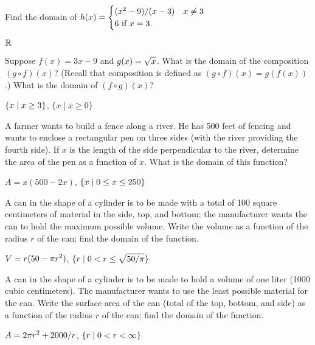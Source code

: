 \begin{exercises}
\exercise Find the domain of $\displaystyle h(x) = \begin{cases}
(x^2-9)/(x-3)& x\neq 3 \\
 6 \mbox{ if $x=3$.} \end{cases}$
\begin{answer} $\mathbb{R}$
\end{answer}

\exercise Suppose $f(x) = 3x-9$ and $\displaystyle g(x) = \sqrt{x}$.  What is the
domain of the composition $(g\circ f)(x)$?  (Recall that 
{\dfont composition%
\/}
is defined as $(g\circ f)(x) = g(f(x))$.)  What is the
domain of $(f\circ g)(x)$?
\begin{answer} $\displaystyle \{x\mid x\ge3\}$, $\{x\mid x\ge0\}$
\end{answer}

\exercise A farmer wants to build a fence along a river.  He has
500 feet of fencing and wants to enclose a rectangular pen on three
sides (with the river providing the fourth side).  If $x$ is the
length of the side perpendicular to the river, determine the area of
the pen as a function of $x$.  What is the domain of this function?
\begin{answer} $A=x(500-2x)$, $\displaystyle \{x\mid 0\le x\le 250\}$
\end{answer}

\exercise A can in the shape of a cylinder is to be made with a total
of 100 square centimeters of material in the side, top, and bottom;
the manufacturer wants the can to hold the maximum possible
volume. Write the volume as a function of the radius $r$ of the can;
find the domain of the function.
\begin{answer} $\displaystyle V=r(50-\pi r^2)$, $\displaystyle \{r\mid 0< r\le \sqrt{50/\pi}\}$
\end{answer}

\exercise A can in the shape of a cylinder is to be made to hold a
volume of one liter (1000 cubic centimeters). The manufacturer wants
to use the least possible material for the can. Write the surface area
of the can (total of the top, bottom, and side) as a function of the
radius $r$ of the can; find the domain of the function.
\begin{answer} $\displaystyle A=2\pi r^2+2000/r$, $\displaystyle \{r\mid 0<r<\infty\}$
\end{answer}

\end{exercises}

